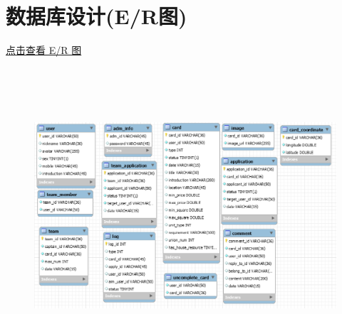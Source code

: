 \chapter{数据库设计(E/R图)}

\href{https://documentation-1303131952.cos.ap-beijing.myqcloud.com/iron_man/%E6%95%B0%E6%8D%AE%E5%BA%93%E8%AE%BE%E8%AE%A1%E5%9B%BE.png}{点击查看 E/R 图}

\begin{figure}[h]
    \centering
    \includegraphics[height=11.0cm,width=14.0cm]{design/image/er.png} 
    \end{figure}
\newpage